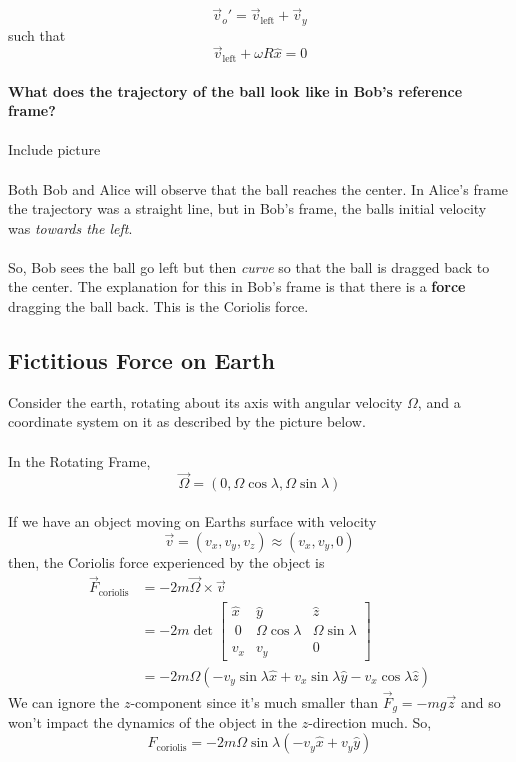 \documentclass[11pt]{article}
\begin{document}
\[ \vec{v}_o' = \vec{v}_{\text{left}}  +\vec{v}_y \]
such that 
\[ \vec{v}_{\text{left}} + \omega R \hat{x} = 0 \]
\\
\textbf{What does the trajectory of the ball look like in Bob's reference frame?}
\\
\\
Include picture
\\
\\
Both Bob and Alice will observe that the ball reaches the center. In Alice's frame the trajectory was a straight line, but in Bob's frame, the balls initial velocity was \emph{towards the left}. 
\\
\\
So, Bob sees the ball go left but then \emph{curve} so that the ball is dragged back to the center. The explanation for this in Bob's frame is that there is a \textbf{force} dragging the ball back. This is the Coriolis force.
\\
\subsection{Fictitious Force on Earth}
Consider the earth, rotating about its axis with angular velocity $\Omega$, and a coordinate system on it as described by the picture below.
\\
\\
In the Rotating Frame, 
\[ \vec{\Omega} = \left(0, \Omega\cos\lambda, \Omega\sin\lambda  \right)  \]
\\
If we have an object moving on Earths surface with velocity
\[ \vec{v} = \left(v_x, v_y, v_z\right) \approx \left(v_x, v_y, 0\right) \]
then, the Coriolis force experienced by the object is 
\begin{align*}
  \vec{F}_{\text{coriolis}} &= -2m\vec{\Omega} \times \vec{v} \\
  &= -2m \det \begin{bmatrix}
    \hat{x} & \hat{y} & \hat{z} \\\
    0 & \Omega \cos\lambda & \Omega \sin\lambda \\
    v_x & v_y & 0
  \end{bmatrix} \\
  &= -2m\Omega \left(-v_y \sin\lambda \hat{x} + v_x \sin\lambda \hat{y} - v_x \cos\lambda \hat{z}\right)
\end{align*}
We can ignore the $z$-component since it's much smaller than $\vec{F}_{g} = -mg\vec{z}$ and so won't impact the dynamics of the object in the $z$-direction much. So,
\[ F_{\text{coriolis}} = -2m\Omega\sin\lambda \left( -v_y \hat{x} + v_y \hat{y} \right) \]
\end{document}
